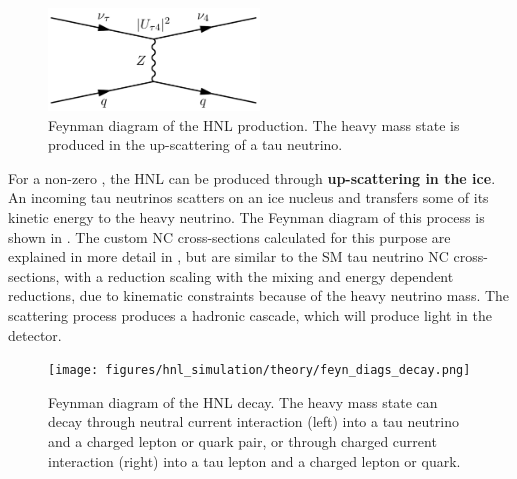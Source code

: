 \begin{figure}[h]
    \includegraphics[width=0.5\textwidth]{figures/hnl_simulation/theory/feyn_diags_production.png}
    \caption[Feynman diagram of heavy neutral lepton production]{Feynman diagram of the HNL production. The heavy mass state is produced in the up-scattering of a tau neutrino.}
\end{figure}

For a non-zero , the HNL can be produced through \textbf{up-scattering in the ice}. An incoming tau neutrinos scatters on an ice nucleus and transfers some of its kinetic energy to the heavy neutrino. The Feynman diagram of this process is shown in . The custom NC cross-sections calculated for this purpose are explained in more detail in , but are similar to the SM tau neutrino NC cross-sections, with a reduction scaling with the mixing  and energy dependent reductions, due to kinematic constraints because of the heavy neutrino mass. The scattering process produces a hadronic cascade, which will produce light in the detector.

\begin{figure}[h]
    \texttt{[image: figures/hnl\_simulation/theory/feyn\_diags\_decay.png]}
    \caption[Feynman diagram of heavy neutral lepton decay]{Feynman diagram of the HNL decay. The heavy mass state can decay through neutral current interaction (left) into a tau neutrino and a charged lepton or quark pair, or through charged current interaction (right) into a tau lepton and a charged lepton or quark.}
\end{figure}

